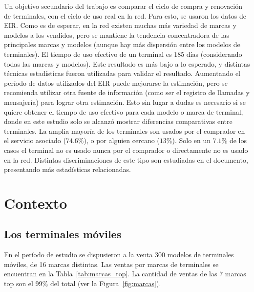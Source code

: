 Un objetivo secundario del trabajo es comparar el ciclo de compra y renovación de terminales,
con el ciclo de uso real en la red.
Para esto, se usaron los datos de EIR.
Como es de esperar, en la red existen muchas más variedad de marcas y modelos a los vendidos, 
pero se mantiene la tendencia concentradora de las principales marcas y modelos (aunque hay más dispersión entre los modelos de terminales).
El tiempo de uso efectivo de un terminal es $185$ días (considerando todas las marcas y modelos).
Este resultado es más bajo a lo esperado, y distintas técnicas estadísticas fueron utilizadas para validar el resultado.
Aumentando el período de datos utilizados del EIR puede mejorarse la estimación, pero se recomienda utilizar otra fuente de información 
(como ser el registro de llamadas y mensajería) para lograr otra estimación. 
Esto sin lugar a dudas es necesario si se quiere obtener el tiempo de uso efectivo para cada modelo o marca de terminal, 
donde en este estudio solo se alcanzó mostrar diferencias comparativas entre terminales.
La amplia mayoría de los terminales son usados por el comprador en el servicio asociado ($74.6\%$), o por alguien cercano ($13\%$). 
Solo en un $7.1\%$ de los casos el terminal no es usado nunca por el comprador o directamente no es usado en la red. 
Distintas discriminaciones de este tipo son estudiadas en el documento, presentando más estadísticas relacionadas.





\chapter{Contexto}
\label{chap:contexto}

\lipsum[1-2] %


\section{Los terminales móviles}
\label{sec:terminales}

En el período de estudio se dispusieron a la venta 300 modelos de terminales móviles, 
de 16 marcas distintas. 
Las ventas por marcas de terminales se encuentran en la Tabla~\ref{tab:marcas_top}.
La cantidad de ventas de las 7 marcas top son el 
99\% del total 
(ver la Figura~\ref{fig:marcas}).


